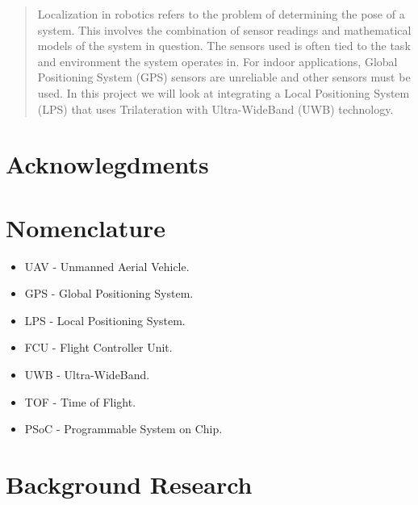 \documentclass[12pt]{report}
\begin{document}
    
    \begin{abstract}
        Localization in robotics refers to the problem of determining the pose of a system.
        This involves the combination of sensor readings and mathematical models of the system in question.
        The sensors used is often tied to the task and environment the system operates in.
        For indoor applications, Global Positioning System (GPS) sensors are unreliable and other sensors must be used.
        In this project we will look at integrating a Local Positioning System (LPS) that uses Trilateration with Ultra-WideBand (UWB) technology.
    \end{abstract}

    \chapter*{Acknowlegdments}
    \lipsum[2-4]

    \chapter*{Nomenclature}
    \begin{itemize}[label={}]
        \item UAV - Unmanned Aerial Vehicle.
        \item GPS - Global Positioning System.
        \item LPS - Local Positioning System.
        \item FCU - Flight Controller Unit.
        \item UWB - Ultra-WideBand.
        \item TOF - Time of Flight.
        \item PSoC - Programmable System on Chip.
    \end{itemize}
    \tableofcontents

    

    

    \chapter{Background Research}\label{ch:background-research}
    \lipsum[2-4]
    \printbibliography[heading=bibintoc]
\end{document}
